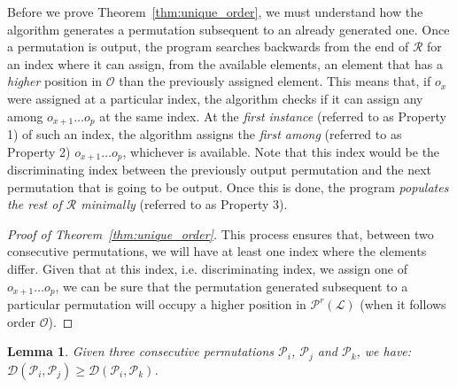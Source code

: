 \documentclass{article}
\newtheorem{lemma}[defn]{Lemma}
\begin{document}
Before we prove Theorem~\ref{thm:unique_order}, we must understand how the algorithm generates a permutation subsequent to an already generated one. Once a permutation is output, the program searches backwards from the end of $\mathcal{R}$ for an index where it can assign, from the available elements, an element that has a \emph{higher} position in $\mathcal{O}$ than the previously assigned element. This means that, if $o_x$ were assigned at a particular index, the algorithm checks if it can assign any among $o_{x+1} \ldots o_p$ at the same index. At the \emph{first instance} (referred to as Property 1) of such an index, the algorithm assigns the \emph{first among} (referred to as Property 2) $o_{x+1} \ldots o_p$, whichever is available. Note that this index would be the discriminating index between the previously output permutation and the next permutation that is going to be output. Once this is done, the program \emph{populates the rest of $\mathcal{R}$ minimally} (referred to as Property 3).

\begin{proof}[Proof of Theorem~\ref{thm:unique_order}]
This process ensures that, between two consecutive permutations, we will have at least one index where the elements differ. Given that at this index, i.e. discriminating index, we assign one of $o_{x+1} \ldots o_p$, we can be sure that the permutation generated subsequent to a particular permutation will occupy a higher position in $\mathcal{P}^r(\mathcal{L})$ (when it follows order $\mathcal{O}$). \end{proof}

\begin{lemma}
\label{lemma:disc}
 Given three consecutive permutations $\mathcal{P}_{i}$, $\mathcal{P}_j$ and $\mathcal{P}_{k}$, we have: \\ $\mathcal{D}(\mathcal{P}_{i},\mathcal{P}_j) \ge \mathcal{D}(\mathcal{P}_{i},\mathcal{P}_{k})$.
\end{lemma}
\end{document}
